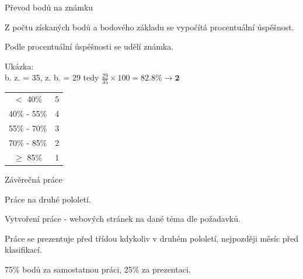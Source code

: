 \documentclass[aspectratio=1610]{beamer}
\begin{document}
\begin{frame}{Převod bodů na známku}
    \begin{cardTiny}
        \begin{flushleft}
            Z počtu získaných bodů a bodového základu se vypočítá procentuální úspěšnost.

            Podle procentuální úspěšnosti se udělí známka.

            
            
            Ukázka:\\ b. z. = 35, z. b. = 29  tedy  $\frac{29}{35} \times 100 = 82.8\% \to \textbf{2}$
        \end{flushleft}
    \end{cardTiny}
    \begin{cardTiny}
        \begin{center}
            \begin{tabular}{ |c|c| } 
                \hline
                $<$ 40\% & 5 \\ 
                40\% - 55\% & 4 \\ 
                55\% - 70\% & 3 \\ 
                70\% - 85\% & 2 \\ 
                $\geq$ 85\% & 1 \\ 
                \hline
            \end{tabular}
        \end{center}
    \end{cardTiny}
\end{frame}

\begin{frame}{Závěrečná práce}
    \begin{cardTiny}
        \begin{flushleft}
            Práce na druhé pololetí.
            
            Vytvoření práce - webových stránek na dané téma dle požadavků.

            Práce se prezentuje před třídou kdykoliv v druhém pololetí, nejpozději měsíc před klasifikací.
            
            \vspace{2ex}
            75\% bodů za samostatnou práci, 25\% za prezentaci.
        \end{flushleft}
    \end{cardTiny}
\end{frame}
\end{document}
